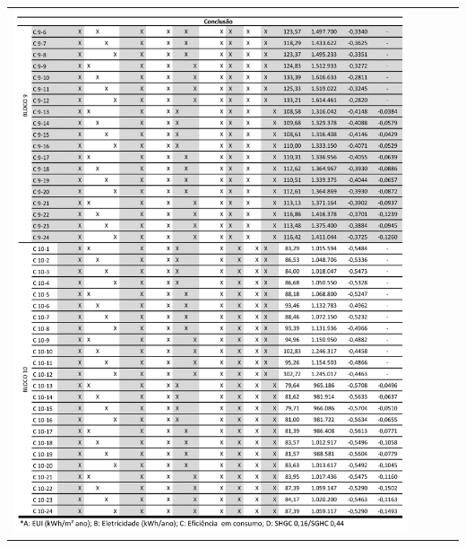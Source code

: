 \begin{table}[H]
    \centering
    \begin{tabular}{l}
        \includegraphics[width=0.9\textwidth]{figures/appendices/tabela08.png}
    \end{tabular}
\end{table}